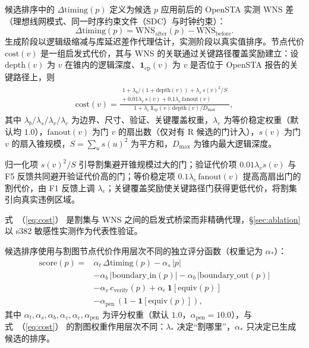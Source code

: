 \documentclass[journal]{IEEEtran}
\renewcommand{\eqref}[1]{\textup{（\ref{#1}）}}
\begin{document}
候选排序中的 $\Delta\mathrm{timing}(p)$ 定义为候选 $p$ 应用前后的 OpenSTA 实测 WNS 差（理想线网模式、同一时序约束文件（SDC）与时钟约束）：
\begin{equation}\label{eq:dtiming}
\Delta\mathrm{timing}(p) = \mathrm{WNS}_{\mathrm{after}}(p) - \mathrm{WNS}_{\mathrm{before}}.
\end{equation}
生成阶段以逻辑级缩减与库延迟差作代理估计，实测阶段以真实值排序。节点代价 $\mathrm{cost}(v)$ 是一组启发式代价，其与 WNS 的关联通过关键路径覆盖奖励建立：设 $\mathrm{depth}(v)$ 为 $v$ 在锥内的逻辑深度、$\mathbf{1}_{\mathrm{cp}}(v)$ 为 $v$ 是否位于 OpenSTA 报告的关键路径上，则
{\small
\begin{equation}
\label{eq:cost}
\begin{split}
\mathrm{cost}(v) = \frac{\substack{1 + \lambda_b/(1+\mathrm{depth}(v)) + \lambda_s\,s(v)^2/S \\ +\, 0.01\lambda_v\,s(v) + 0.1\lambda_e\,\mathrm{fanout}(v)}}{1 + \lambda_c\,\mathbf{1}_{\mathrm{cp}}(v)\,\mathrm{depth}(v)/D_{\max}},
\end{split}
\end{equation}
}
其中 $\lambda_b/\lambda_s/\lambda_v/\lambda_c$ 为边界、尺寸、验证、关键覆盖权重，$\lambda_e$ 为等价稳定权重（默认均 $1.0$），$\mathrm{fanout}(v)$ 为门 $v$ 的扇出数（仅对有 R 候选的门计入），$s(v)$ 为门 $v$ 的扇入锥规模，$S=\sum_u s(u)^2$ 为平方和，$D_{\max}$ 为锥内最大逻辑深度。

归一化项 $s(v)^2/S$ 引导割集避开锥规模过大的门；验证代价项 $0.01\lambda_v s(v)$ 与 F5 反馈共同避开验证代价高的门；等价稳定项 $0.1\lambda_e\,\mathrm{fanout}(v)$ 提高高扇出门的割代价，由 F1 反馈上调 $\lambda_e$；关键覆盖奖励使关键路径门获得更低代价，将割集引向真实违例区域。

式~\eqref{eq:cost} 是割集与 WNS 之间的启发式桥梁而非精确代理，\S\ref{sec:ablation} 以 s382 敏感性实测作为代表性验证。

候选排序使用与割图节点代价作用层次不同的独立评分函数（权重记为 $\alpha_*$）：
{\small
\begin{equation}\label{eq:score}
\begin{split}
\mathrm{score}(p) = {}&\alpha_t\,\Delta\mathrm{timing}(p) - \alpha_s\,|p| \\
&- \alpha_b\,|\mathrm{boundary\_in}(p)| - \alpha_b\,|\mathrm{boundary\_out}(p)| \\
&- \alpha_v\,c_{\mathrm{verify}}(p) + \alpha_e\,\mathbf{1}[\mathrm{equiv}(p)] \\
&- \alpha_{\mathrm{pen}}\,(1-\mathbf{1}[\mathrm{equiv}(p)]),
\end{split}
\end{equation}
}
其中 $\alpha_t,\alpha_s,\alpha_b,\alpha_v,\alpha_e,\alpha_{\mathrm{pen}}$ 为评分权重（默认 $1.0$，$\alpha_{\mathrm{pen}}=10.0$），与式~\eqref{eq:cost} 的割图权重作用层次不同：$\lambda_*$ 决定“割哪里”，$\alpha_*$ 只决定已生成候选的排序。
\end{document}
